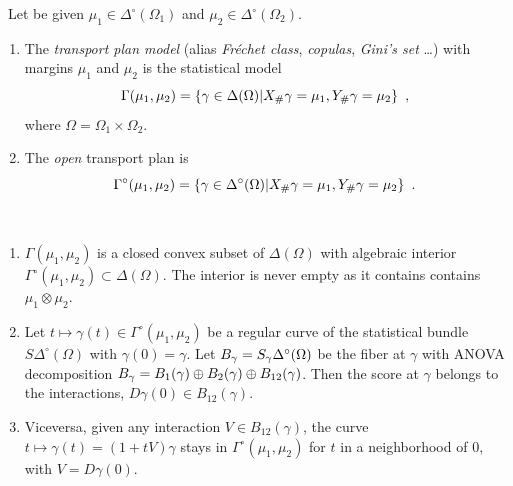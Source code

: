 \documentclass[runningheads]{llncs}
\begin{document}
\begin{definition}\ 
  Let be given $\mu_1 \in \Delta^\circ(\Omega_1)$ and $\mu_2 \in \Delta^\circ(\Omega_2)$.\begin{enumerate}
  \item  The \emph{transport plan model} (alias \emph{Fr\'echet class}, \emph{copulas}, \emph{Gini's set} \dots) with margins $\mu_1$ and $\mu_2$ is the statistical model
%
  \begin{equation*}
    \Gamma(\mu_1,\mu_2) = \left\{ \gamma \in \Delta(\Omega) \middle| X_\# \gamma = \mu_1, Y_\# \gamma = \mu_2 \right\} \ ,
  \end{equation*}
%
where $\Omega=\Omega_1 \times \Omega_2$.
\item  The \emph{open} transport plan is 
%
  \begin{equation*}
    \Gamma^\circ(\mu_1,\mu_2) = \setof{\gamma \in \Delta^\circ(\Omega)}{X_\# \gamma = \mu_1, Y_\# \gamma = \mu_2} \ .
  \end{equation*}
%
\end{enumerate}
\end{definition}

\begin{proposition}\ 
  \begin{enumerate}
  \item $\Gamma(\mu_1,\mu_2)$ is a closed convex subset of $\Delta(\Omega)$ with algebraic interior $\Gamma^\circ(\mu_1,\mu_2) \subset \Delta(\Omega)$. The interior is never empty as it contains  contains $\mu_1 \otimes \mu_2$.
  \item Let $t \mapsto \gamma(t) \in \Gamma^\circ(\mu_1,\mu_2)$ be a regular curve of the statistical bundle $S\Delta^\circ(\Omega)$ with $\gamma(0)=\gamma$. Let $B_{\gamma} = S_\gamma \Delta^\circ(\Omega)$ be the fiber at $\gamma$ with ANOVA decomposition $B_{\gamma} = B_1(\gamma) \oplus B_2(\gamma) \oplus B_{12}(\gamma)$. Then the score at $\gamma$ belongs to the interactions, $D\gamma(0) \in B_{12}(\gamma)$.
  \item Viceversa, given any interaction $V \in B_{12}(\gamma)$, the curve $t \mapsto \gamma(t) = (1+tV)\gamma$ stays in $\Gamma^\circ(\mu_1,\mu_2)$ for $t$ in a neighborhood of 0, with $V = D\gamma(0)$. 
\end{enumerate}
\end{proposition}
\end{document}
